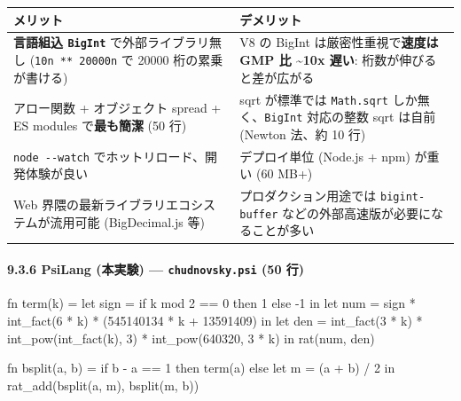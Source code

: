 \documentclass[
]{ltjsarticle}
\newenvironment{Shaded}{}{}
\newcommand{\NormalTok}[1]{#1}
\newcounter{none} %
\begin{document}
{\def\LTcaptype{none} %
\begin{longtable}[]{@{}
  >{\raggedright\arraybackslash}p{}
  >{\raggedright\arraybackslash}p{}@{}}
\toprule\noalign{}
\begin{minipage}[b]{\linewidth}\raggedright
メリット
\end{minipage} & \begin{minipage}[b]{\linewidth}\raggedright
デメリット
\end{minipage} \\
\midrule\noalign{}
\endhead
\bottomrule\noalign{}
\endlastfoot
\textbf{言語組込 \texttt{BigInt}} で外部ライブラリ無し
(\texttt{10n\ **\ 20000n} で 20000 桁の累乗が書ける) & V8 の BigInt
は厳密性重視で\textbf{速度は GMP 比 \textasciitilde10x 遅い}:
桁数が伸びると差が広がる \\
アロー関数 + オブジェクト spread + ES modules で\textbf{最も簡潔} (50
行) & sqrt が標準では \texttt{Math.sqrt} しか無く、\texttt{BigInt}
対応の整数 sqrt は自前 (Newton 法、約 10 行) \\
\texttt{node\ -\/-watch} でホットリロード、開発体験が良い & デプロイ単位
(Node.js + npm) が重い (60 MB+) \\
Web 界隈の最新ライブラリエコシステムが流用可能 (BigDecimal.js 等) &
プロダクション用途では \texttt{bigint-buffer}
などの外部高速版が必要になることが多い \\
\end{longtable}
}

\paragraph{\texorpdfstring{9.3.6 PsiLang (本実験) ---
\texttt{chudnovsky.psi} (50
行)}{9.3.6 PsiLang (本実験) --- chudnovsky.psi (50 行)}}\label{psilang-ux672cux5b9fux9a13-chudnovsky.psi-50-ux884c}

\begin{Shaded}
\begin{Highlighting}[]
\NormalTok{fn term(k) =}
\NormalTok{  let sign = if k mod 2 == 0 then 1 else {-}1 in}
\NormalTok{  let num  = sign * int\_fact(6 * k) * (545140134 * k + 13591409) in}
\NormalTok{  let den  = int\_fact(3 * k) * int\_pow(int\_fact(k), 3) * int\_pow(640320, 3 * k) in}
\NormalTok{  rat(num, den)}

\NormalTok{fn bsplit(a, b) =}
\NormalTok{  if b {-} a == 1 then term(a)}
\NormalTok{  else}
\NormalTok{    let m = (a + b) / 2 in}
\NormalTok{    rat\_add(bsplit(a, m), bsplit(m, b))}
\end{Highlighting}
\end{Shaded}
\end{document}
